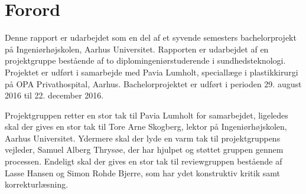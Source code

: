 \chapter*{Forord}

Denne rapport er udarbejdet som en del af et syvende semesters bachelorprojekt på Ingeniørhøjskolen, Aarhus Universitet. Rapporten er udarbejdet af en projektgruppe bestående af to diplomingeniørstuderende i sundhedsteknologi. Projektet er udført i samarbejde med Pavia Lumholt, speciallæge i plastikkirurgi på OPA Privathospital, Aarhus. 
Bachelorprojektet er udført i perioden 29. august 2016 til 22. december 2016. 

Projektgruppen retter en stor tak til Pavia Lumholt for samarbejdet, ligeledes skal der gives en stor tak til Tore Arne Skogberg, lektor på Ingeniørhøjskolen, Aarhus Universitet. Ydermere skal der lyde en varm tak til projektgruppens vejleder, Samuel Alberg Thrysøe, der har hjulpet og støttet gruppen gennem processen. Endeligt skal der gives en stor tak til reviewgruppen bestående af Lasse Hansen og Simon Rohde Bjerre, som har ydet konstruktiv kritik samt korrekturlæsning. 


 